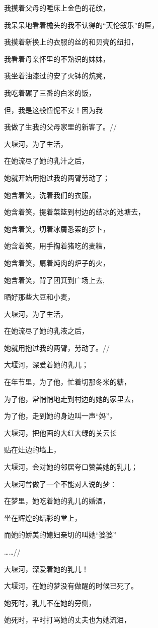 \documentclass[letterpaper,12pt,english]{sphinxmanual}
\begin{document}
我摸着父母的睡床上金色的花纹，

我呆呆地看着檐头的我不认得的“天伦叙乐”的匾，

我摸着新换上的衣服的丝的和贝壳的纽扣，

我看着母亲怀里的不熟识的妹妹，

我坐着油漆过的安了火钵的炕凳，

我吃着碾了三番的白米的饭，

但，我是这般忸怩不安！因为我

我做了生我的父母家里的新客了。//

大堰河，为了生活，

在她流尽了她的乳汁之后，

她就开始用抱过我的两臂劳动了；

她含着笑，洗着我们的衣服，

她含着笑，提着菜篮到村边的结冰的池塘去，

她含着笑，切着冰屑悉索的萝卜，

她含着笑，用手掏着猪吃的麦糟，

她含着笑，扇着炖肉的炉子的火，

她含着笑，背了团箕到广场上去,

晒好那些大豆和小麦，

大堰河，为了生活，

在她流尽了她的乳液之后，

她就用抱过我的两臂，劳动了。//

大堰河，深爱着她的乳儿；

在年节里，为了他，忙着切那冬米的糖，

为了他，常悄悄地走到村边的她的家里去，

为了他，走到她的身边叫一声“妈”，

大堰河，把他画的大红大绿的关云长

贴在灶边的墙上，

大堰河，会对她的邻居夸口赞美她的乳儿；

大堰河曾做了一个不能对人说的梦：

在梦里，她吃着她的乳儿的婚酒，

坐在辉煌的结彩的堂上，

而她的娇美的媳妇亲切的叫她“婆婆”

……//

大堰河，深爱着她的乳儿！

大堰河，在她的梦没有做醒的时候已死了。

她死时，乳儿不在她的旁侧，

她死时，平时打骂她的丈夫也为她流泪，
\end{document}
